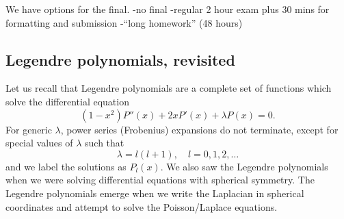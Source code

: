 We have options for the final.
-no final
-regular 2 hour exam plus 30 mins for formatting and submission
-``long homework'' (48 hours)


\subsection*{Legendre polynomials, revisited}

Let us recall that Legendre polynomials are a complete set of functions which solve the differential equation
\begin{equation}
    (1-x^2)P''(x)+2xP'(x) + \lambda P(x)=0.
\end{equation}
For generic $\lambda$, power series (Frobenius) expansions do not terminate, except for special values of $\lambda$ such that
\begin{equation}
    \lambda = l(l+1), \quad l = 0,1,2,\dots
\end{equation}
and we label the solutions as $P_l(x)$. We also saw the Legendre polynomials when we were solving differential equations with spherical symmetry. The Legendre polynomials emerge when we write the Laplacian in spherical coordinates and attempt to solve the Poisson/Laplace equations.

